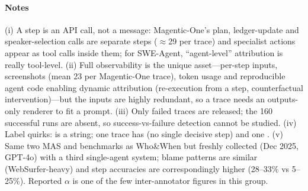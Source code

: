 \paragraph{Notes} (i) A step is an API call, not a message: Magentic-One's plan, ledger-update and speaker-selection calls are separate steps ($\approx$29 per trace) and specialist actions appear as tool calls inside them; for SWE-Agent, ``agent-level'' attribution is really tool-level. (ii) Full observability is the unique asset---per-step inputs, screenshots (mean 23 per Magentic-One trace), token usage and reproducible agent code enabling dynamic attribution (re-execution from a step, counterfactual intervention)---but the inputs are highly redundant, so a trace needs an outputs-only renderer to fit a prompt. (iii) Only failed traces are released; the 160 successful runs are absent, so success-vs-failure detection cannot be studied. (iv) Label quirks:  is a string; one trace has  (no single decisive step) and one . (v) Same two MAS and benchmarks as Who\&When but freshly collected (Dec 2025, GPT-4o) with a third single-agent system; blame patterns are similar (WebSurfer-heavy) and step accuracies are correspondingly higher (28--33\% vs 5--25\%). Reported $\alpha$ is one of the few inter-annotator figures in this group.
